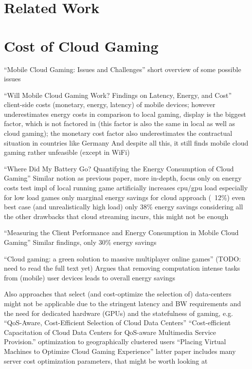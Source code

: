 \section{Related Work}


\section{Cost of Cloud Gaming}

``Mobile Cloud Gaming: Issues and Challenges'' \cite{Soliman2013}
short overview of some possible issues

``Will Mobile Cloud Gaming Work? Findings on Latency, Energy, and Cost'' \cite{Lampe:2013:MCG:2514943.2515398}
client-side costs (monetary, energy, latency) of mobile devices; however underestimates energy costs in comparison to local gaming, display is the biggest factor, which is not factored in (this factor is also the same in local as well as cloud gaming); the monetary cost factor also underestimates the contractual situation in countries like Germany
And despite all this, it still finds mobile cloud gaming rather unfeasible (except in WiFi)

``Where Did My Battery Go? Quantifying the Energy Consumption of Cloud Gaming'' \cite{6924295}
Similar notion as previous paper, more in-depth, focus only on energy costs
test impl of local running game artificially increases cpu/gpu load
especially for low load games only marginal energy savings for cloud approach (~12\%)
even best case (and unrealistically high load) only 38\% energy savings
considering all the other drawbacks that cloud streaming incurs, this might not be enough

``Measuring the Client Performance and Energy Consumption in Mobile Cloud Gaming'' \cite{Huang:2014:MCP:2755535.2755542}
Similar findings, only 30\% energy savings


``Cloud gaming: a green solution to massive multiplayer online games'' \cite{6882299}
(TODO: need to read the full text yet)
Argues that removing computation intense tasks from (mobile) user devices leads to overall energy savings


Also approaches that select (and cost-optimize the selection of) data-centers might not be applicable due to the stringent latency and BW requirements and the need for dedicated hardware (GPUs) and the statefulness of gaming, e.g.
``QoS-Aware, Cost-Efficient Selection of Cloud Data Centers'' \cite{6740249}
``Cost-efficient Capacitation of Cloud Data Centers for QoS-aware Multimedia Service Provision.'' \cite{hans2014cost} optimization to geographically clustered users
``Placing Virtual Machines to Optimize Cloud Gaming Experience'' \cite{6853364}
latter paper includes many server cost optimization parameters, that might be worth looking at

